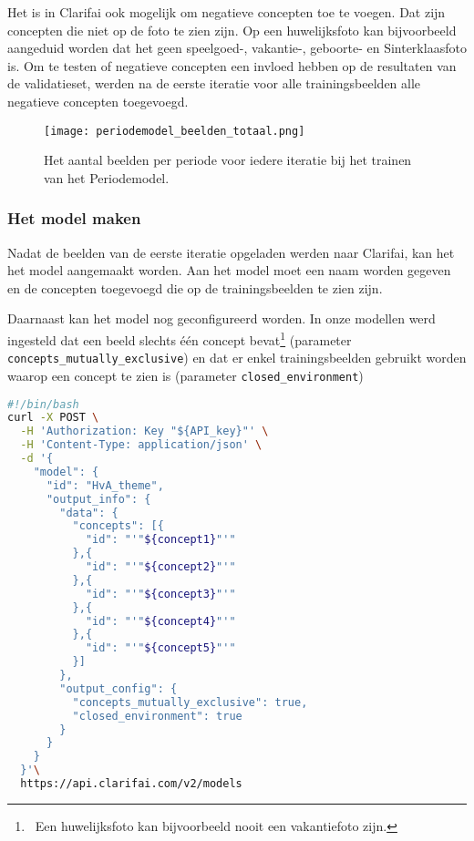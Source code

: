 Het is in Clarifai ook mogelijk om negatieve concepten toe te voegen. Dat zijn concepten die niet op de foto te zien zijn. Op een huwelijksfoto kan bijvoorbeeld aangeduid worden dat het geen speelgoed-, vakantie-, geboorte- en Sinterklaasfoto is. Om te testen of negatieve concepten een invloed hebben op de resultaten van de validatieset, werden na de eerste iteratie voor alle trainingsbeelden alle negatieve concepten toegevoegd.

\begin{figure}[h]
	\centering
	\texttt{[image: periodemodel\_beelden\_totaal.png]}\hfill
	\caption[Het aantal beelden per periode voor iedere iteratie bij het trainen van het Periodemodel]{Het aantal beelden per periode voor iedere iteratie bij het trainen van het Periodemodel.}
	\label{fig:periodemodel-iteraties}
\end{figure}


\subsubsection{Het model maken}
\label{subsubsec:model-maken}


Nadat de beelden van de eerste iteratie opgeladen werden naar Clarifai, kan het  het model aangemaakt worden. Aan het model moet een naam worden gegeven en de concepten toegevoegd die op de trainingsbeelden te zien zijn. 

Daarnaast kan het model nog geconfigureerd worden. In onze modellen werd ingesteld dat een beeld slechts één concept bevat\footnote{~Een huwelijksfoto kan bijvoorbeeld nooit een vakantiefoto zijn.} (parameter \texttt{concepts\_mutually\_exclusive}) en dat er enkel trainingsbeelden gebruikt worden waarop een concept te zien is (parameter \texttt{closed\_environment})

\begin{lstlisting}[language=bash,caption=Bash commando om een custom model met vijf concepten te creëren]
#!/bin/bash
curl -X POST \
  -H 'Authorization: Key "${API_key}"' \
  -H 'Content-Type: application/json' \
  -d '{
    "model": {
      "id": "HvA_theme",
      "output_info": {
        "data": {
          "concepts": [{
            "id": "'"${concept1}"'"
          },{
            "id": "'"${concept2}"'"
          },{
            "id": "'"${concept3}"'"
          },{
            "id": "'"${concept4}"'"
          },{
            "id": "'"${concept5}"'"
          }]
        },
        "output_config": {
          "concepts_mutually_exclusive": true,
          "closed_environment": true
        }
      }
    }
  }'\
  https://api.clarifai.com/v2/models
\end{lstlisting}

